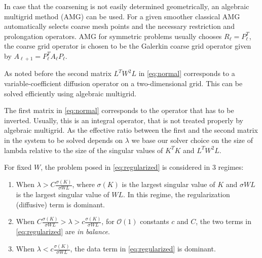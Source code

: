 In case that the coarsening is not easily determined geometrically, an
algebraic multigrid method (AMG) can be used. For a given smoother
classical AMG automatically selects coarse mesh points and the
necessary restriction and prolongation operators. AMG for symmetric
problems usually chooses $R_\ell = P_\ell^T$, the coarse grid operator
is chosen to be the Galerkin coarse grid operator given by
$A_{\ell+1} = P_\ell^T A_\ell P_\ell$.

As noted before the second matrix $L^T W^2 L$ in \eqref{eq:normal}
corresponds to a variable-coefficient diffusion operator on a
two-dimensional grid. This can be solved efficiently using algebraic multigrid.

The first matrix in \eqref{eq:normal} corresponds to the operator that
has to be inverted. Usually, this is an integral operator, that is not
treated properly by algebraic multigrid. As the effective ratio
between the first and the second matrix in the system to be solved
depends on $\lambda$ we base our solver choice on the size of lambda
relative to the size of the singular values of $K^T K$ and $L^T W^2
L$.

For fixed $W$, the problem posed in \eqref{eq:regularized} is considered in 3 regimes:
\begin{enumerate}
\item When $\lambda > C \frac{\sigma(K)}{\sigma{WL}}$, where
  $\sigma(K)$ is the largest singular value of $K$ and $\sigma{WL}$ is
  the largest singular value of $WL$.  In this regime, the
  regularization (diffusive) term is dominant.
\item When $C \frac{\sigma(K)}{\sigma{WL}} > \lambda > c
  \frac{\sigma(K)}{\sigma{WL}}$, for $\mathcal{O}(1)$ constants $c$
  and $C$, the two terms in \eqref{eq:regularized} are {\it in
    balance}.
\item When $\lambda < c \frac{\sigma(K)}{\sigma{WL}}$, the data term
  in \eqref{eq:regularized} is dominant.
\end{enumerate}

